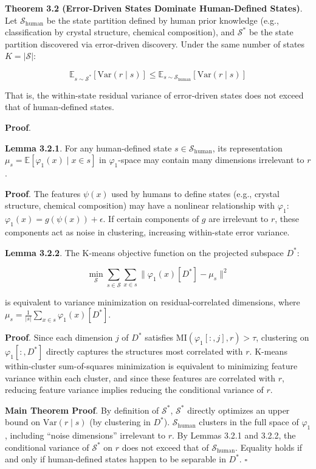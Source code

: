 \documentclass[
  12pt,
]{article}
\begin{document}
\textbf{Theorem 3.2 (Error-Driven States Dominate Human-Defined States)}. Let $\mathcal{S}_{\text{human}}$ be the state partition defined by human prior knowledge (e.g., classification by crystal structure, chemical composition), and $\mathcal{S}^*$ be the state partition discovered via error-driven discovery. Under the same number of states $K = |\mathcal{S}|$:

\[\mathbb{E}_{s \sim \mathcal{S}^*}[\text{Var}(r \mid s)] \leq \mathbb{E}_{s \sim \mathcal{S}_{\text{human}}}[\text{Var}(r \mid s)]\]

That is, the within-state residual variance of error-driven states does not exceed that of human-defined states.

\textbf{Proof}.

\textbf{Lemma 3.2.1}. For any human-defined state $s \in \mathcal{S}_{\text{human}}$, its representation $\mu_s = \mathbb{E}[\varphi_1(x) \mid x \in s]$ in $\varphi_1$-space may contain many dimensions irrelevant to $r$.

\textbf{Proof}. The features $\psi(x)$ used by humans to define states (e.g., crystal structure, chemical composition) may have a nonlinear relationship with $\varphi_1$: $\varphi_1(x) = g(\psi(x)) + \epsilon$. If certain components of $g$ are irrelevant to $r$, these components act as noise in clustering, increasing within-state error variance.

\textbf{Lemma 3.2.2}. The K-means objective function on the projected subspace $D^*$:

\[\min_{\mathcal{S}} \sum_{s \in \mathcal{S}} \sum_{x \in s} \|\varphi_1(x)[D^*] - \mu_s\|^2\]

is equivalent to variance minimization on residual-correlated dimensions, where $\mu_s = \frac{1}{|s|} \sum_{x \in s} \varphi_1(x)[D^*]$.

\textbf{Proof}. Since each dimension $j$ of $D^*$ satisfies $\text{MI}(\varphi_1[:, j], r) > \tau$, clustering on $\varphi_1[:, D^*]$ directly captures the structures most correlated with $r$. K-means within-cluster sum-of-squares minimization is equivalent to minimizing feature variance within each cluster, and since these features are correlated with $r$, reducing feature variance implies reducing the conditional variance of $r$.

\textbf{Main Theorem Proof}. By definition of $\mathcal{S}^*$, $\mathcal{S}^*$ directly optimizes an upper bound on $\text{Var}(r \mid s)$ (by clustering in $D^*$). $\mathcal{S}_{\text{human}}$ clusters in the full space of $\varphi_1$, including ``noise dimensions'' irrelevant to $r$. By Lemmas 3.2.1 and 3.2.2, the conditional variance of $\mathcal{S}^*$ on $r$ does not exceed that of $\mathcal{S}_{\text{human}}$. Equality holds if and only if human-defined states happen to be separable in $D^*$. $\square$
\end{document}

